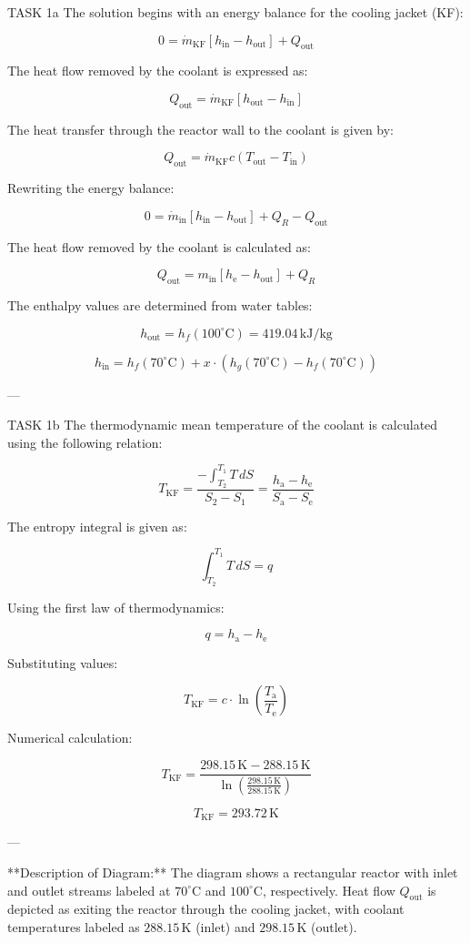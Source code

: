 TASK 1a  
The solution begins with an energy balance for the cooling jacket (KF):  

\[
0 = \dot{m}_{\text{KF}} \left[ h_{\text{in}} - h_{\text{out}} \right] + Q_{\text{out}}
\]  

The heat flow removed by the coolant is expressed as:  

\[
Q_{\text{out}} = \dot{m}_{\text{KF}} \left[ h_{\text{out}} - h_{\text{in}} \right]
\]  

The heat transfer through the reactor wall to the coolant is given by:  

\[
Q_{\text{out}} = \dot{m}_{\text{KF}} c \left( T_{\text{out}} - T_{\text{in}} \right)
\]  

Rewriting the energy balance:  

\[
0 = \dot{m}_{\text{in}} \left[ h_{\text{in}} - h_{\text{out}} \right] + Q_R - Q_{\text{out}}
\]  

The heat flow removed by the coolant is calculated as:  

\[
Q_{\text{out}} = m_{\text{in}} \left[ h_{\text{e}} - h_{\text{out}} \right] + Q_R
\]  

The enthalpy values are determined from water tables:  

\[
h_{\text{out}} = h_f(100^\circ\text{C}) = 419.04 \, \text{kJ/kg}
\]  

\[
h_{\text{in}} = h_f(70^\circ\text{C}) + x \cdot \left( h_g(70^\circ\text{C}) - h_f(70^\circ\text{C}) \right)
\]  

---

TASK 1b  
The thermodynamic mean temperature of the coolant is calculated using the following relation:  

\[
T_{\text{KF}} = \frac{-\int_{T_2}^{T_1} T \, dS}{S_2 - S_1} = \frac{h_{\text{a}} - h_{\text{e}}}{S_{\text{a}} - S_{\text{e}}}
\]  

The entropy integral is given as:  

\[
\int_{T_2}^{T_1} T \, dS = q
\]  

Using the first law of thermodynamics:  

\[
q = h_{\text{a}} - h_{\text{e}}
\]  

Substituting values:  

\[
T_{\text{KF}} = c \cdot \ln \left( \frac{T_{\text{a}}}{T_{\text{e}}} \right)
\]  

Numerical calculation:  

\[
T_{\text{KF}} = \frac{298.15 \, \text{K} - 288.15 \, \text{K}}{\ln \left( \frac{298.15 \, \text{K}}{288.15 \, \text{K}} \right)}
\]  

\[
T_{\text{KF}} = 293.72 \, \text{K}
\]  

---

**Description of Diagram:**  
The diagram shows a rectangular reactor with inlet and outlet streams labeled at \( 70^\circ\text{C} \) and \( 100^\circ\text{C} \), respectively. Heat flow \( Q_{\text{out}} \) is depicted as exiting the reactor through the cooling jacket, with coolant temperatures labeled as \( 288.15 \, \text{K} \) (inlet) and \( 298.15 \, \text{K} \) (outlet).